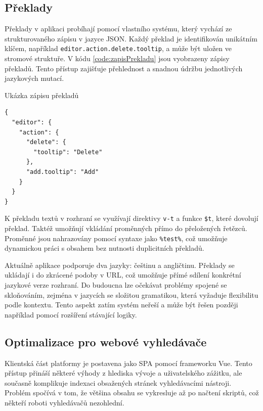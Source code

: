 \subsection{Překlady}

Překlady v aplikaci probíhají pomocí vlastního systému, který vychází ze strukturovaného zápisu v jazyce JSON. 
Každý překlad je identifikován unikátním klíčem, například \texttt{editor.action.delete.tooltip}, a může být uložen ve stromové struktuře. 
V kódu \ref{code:zapisPrekladu} jsou vyobrazeny zápisy překladů.
Tento přístup zajišťuje přehlednost a snadnou údržbu jednotlivých jazykových mutací.


\begin{listing}[ht!]
\caption{Ukázka zápisu překladů}\label{code:zapisPrekladu}
\begin{verbatim}
{
  "editor": {
    "action": {
      "delete": {
        "tooltip": "Delete"
      },
      "add.tooltip": "Add"
    }
  }
}
\end{verbatim}
\end{listing}

K překladu textů v rozhraní se využívají direktivy \texttt{v-t} a funkce \texttt{\$t}, které dovolují překlad.
Taktéž umožňují vkládání proměnných přímo do přeložených řetězců. 
Proměnné jsou nahrazovány pomocí syntaxe jako \texttt{\%test\%}, což umožňuje dynamickou práci s obsahem bez nutnosti duplicitních překladů.

Aktuálně aplikace podporuje dva jazyky: češtinu a angličtinu. 
Překlady se ukládají i do zkrácené podoby v URL, což umožňuje přímé sdílení konkrétní jazykové verze rozhraní. 
Do budoucna lze očekávat problémy spojené se skloňováním, zejména v jazycích se složitou gramatikou, která vyžaduje flexibilitu podle kontextu. 
Tento aspekt zatím systém neřeší a může být řešen později například pomocí rozšíření stávající logiky.


\subsection{Optimalizace pro webové vyhledávače}

Klientská část platformy je postavena jako SPA pomocí frameworku Vue. 
Tento přístup přináší některé výhody z hlediska vývoje a uživatelského zážitku, ale současně komplikuje indexaci obsažených stránek vyhledávacími nástroji. 
Problém spočívá v tom, že většina obsahu se vykresluje až po načtení skriptů, což někteří roboti vyhledávačů nezohlední.

